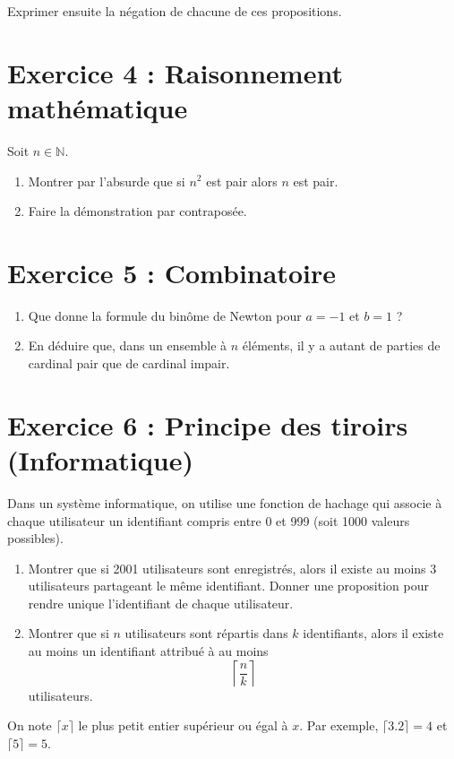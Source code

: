 \documentclass[12pt,a4paper]{article}
\begin{document}
Exprimer ensuite la négation de chacune de ces propositions.

\section*{Exercice 4 : Raisonnement mathématique}

Soit $n \in \mathbb{N}$.

\begin{enumerate}
    \item Montrer par l’absurde que si $n^2$ est pair alors $n$ est pair.
    \item Faire la démonstration par contraposée.
\end{enumerate}

\section*{Exercice 5 : Combinatoire}

\begin{enumerate}
    \item Que donne la formule du binôme de Newton pour $a = -1$ et $b = 1$ ?
    \item En déduire que, dans un ensemble à $n$ éléments, il y a autant de parties de cardinal pair que de cardinal impair.
\end{enumerate}


\section*{Exercice 6 : Principe des tiroirs (Informatique)}

Dans un système informatique, on utilise une fonction de hachage qui associe à chaque utilisateur un identifiant compris entre 0 et 999 (soit 1000 valeurs possibles).

\begin{enumerate}
    \item Montrer que si 2001 utilisateurs sont enregistrés, alors il existe au moins 3 utilisateurs partageant le même identifiant. Donner une proposition pour rendre unique l’identifiant de chaque utilisateur.

    \item Montrer que si $n$ utilisateurs sont répartis dans $k$ identifiants, alors il existe au moins un identifiant attribué à au moins
    \[
    \left\lceil \frac{n}{k} \right\rceil
    \]
    utilisateurs.
\end{enumerate}
On note $\lceil x \rceil$ le plus petit entier supérieur ou égal à $x$. Par exemple, $\lceil 3.2 \rceil = 4$ et $\lceil 5 \rceil = 5$.
\end{document}
